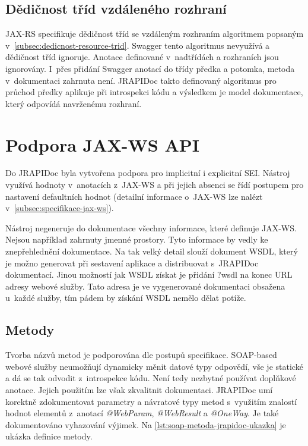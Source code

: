 \documentclass[11pt,twoside,a4paper]{book}
\begin{document}
\subsection{Dědičnost tříd vzdáleného rozhraní}

JAX-RS specifikuje dědičnost tříd se vzdáleným rozhraním algoritmem popsaným
v~\ref{subsec:dedicnost-resource-trid}. Swagger tento algoritmus nevyužívá a
dědičnost tříd ignoruje. Anotace definované v~nadtřídách a rozhraních jsou ignorovány. I~přes
přidání Swagger anotací do třídy předka a potomka, metoda v~dokumentaci zahrnuta
není. JRAPIDoc takto definovaný algoritmus pro průchod předky aplikuje při
introspekci kódu a výsledkem je model dokumentace, který odpovídá navrženému
rozhraní.

\section{Podpora JAX-WS API}

Do JRAPIDoc byla vytvořena podpora pro implicitní i explicitní SEI. Nástroj
využívá hodnoty v~anotacích z~JAX-WS a při jejich absenci se řídí postupem pro
nastavení defaultních hodnot (detailní informace o~JAX-WS lze nalézt
v~\ref{subsec:specifikace-jax-ws}).

Nástroj negeneruje do dokumentace všechny informace, které definuje JAX-WS.
Nejsou například zahrnuty jmenné prostory.
Tyto informace by vedly ke znepřehlednění dokumentace. Na tak velký detail
slouží dokument WSDL, který je možno generovat při sestavení aplikace a
distribuovat s~JRAPIDoc dokumentací. Jinou možností jak WSDL získat je přidání
?wsdl na konec URL adresy webové služby.
Tato adresa je ve vygenerované dokumentaci obsažena u~každé služby, tím pádem by
získání WSDL nemělo dělat potíže.

\subsection{Metody}

Tvorba názvů metod je podporována dle postupů specifikace. SOAP-based webové
služby neumožňují dynamicky měnit datové typy odpovědí, vše je statické a dá se
tak odvodit z~introspekce kódu. Není tedy nezbytné používat doplňkové anotace.
Jejich použitím lze však zkvalitnit dokumentaci. JRAPIDoc umí korektně
zdokumentovat parametry a návratové typy metod s~využitím znalostí hodnot
elementů z~anotací {\em @WebParam}, {\em @WebResult} a {\em @OneWay}. Je také
dokumentováno vyhazování výjimek.
Na \ref{lst:soap-metoda-jrapidoc-ukazka} je ukázka definice metody.
\end{document}
